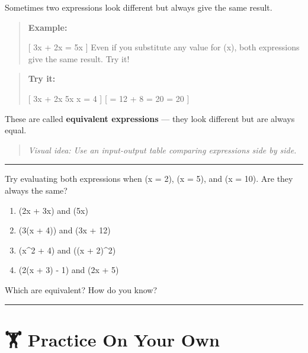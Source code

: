 \documentclass[
  letterpaper,
  DIV=11,
  numbers=noendperiod]{scrreprt}
\providecommand{\tightlist}{%
  \setlength{\itemsep}{0pt}\setlength{\parskip}{0pt}}
\begin{document}
Sometimes two expressions look different but always give the same
result.

\begin{quote}
\textbf{Example:}

{[} 3x + 2x = 5x {]} Even if you substitute any value for (x), both
expressions give the same result. Try it!
\end{quote}

\begin{quote}
\textbf{Try it:}

{[} 3x + 2x \quad {} \quad 5x  x = 4 {]} {[} = 12 +
8 = 20 \quad {}   = 20 {]}
\end{quote}

These are called \textbf{equivalent expressions} --- they look different
but are always equal.

\begin{quote}
\emph{Visual idea: Use an input-output table comparing expressions side
by side.}
\end{quote}

\begin{center}\rule{0.5\linewidth}{0.5pt}\end{center}

Try evaluating both expressions when (x = 2), (x = 5), and (x = 10). Are
they always the same?

\begin{enumerate}
\def\labelenumi{\arabic{enumi}.}
\tightlist
\item
  (2x + 3x) and (5x)\\
\item
  (3(x + 4)) and (3x + 12)\\
\item
  (x\^{}2 + 4) and ((x + 2)\^{}2)\\
\item
  (2(x + 3) - 1) and (2x + 5)
\end{enumerate}

Which are equivalent? How do you know?

\begin{center}\rule{0.5\linewidth}{0.5pt}\end{center}

\section*{🏋️ Practice On Your Own}\label{practice-on-your-own-8}
\end{document}
